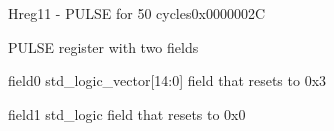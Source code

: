 \documentclass{article}
\begin{document}
\begin{register}{H}{reg11 - PULSE for 50 cycles}{0x0000002C}  \par PULSE register with two fields \regnewline
  \label{reg11}
\regnewline
  \begin{regdesc}\begin{reglist}[field0]
    \item [field0] std{\_}logic{\_}vector[14:0] field that resets to 0x3    \item [field1] std{\_}logic field that resets to 0x0  \end{reglist}\end{regdesc}
\end{register}
\end{document}
